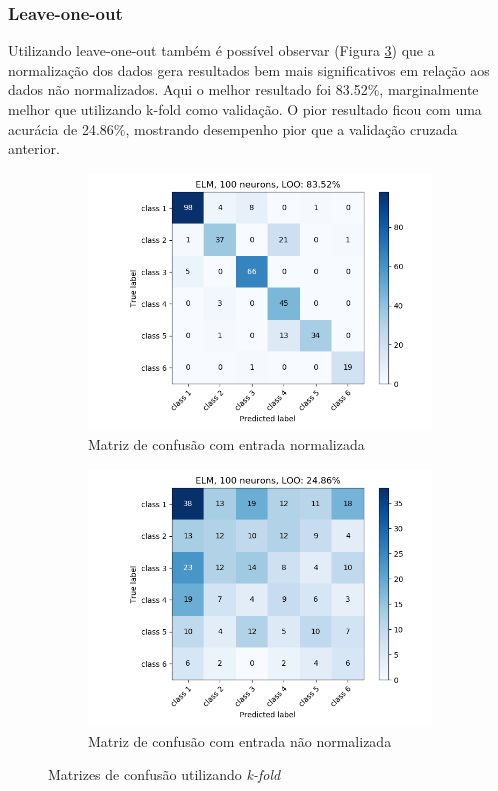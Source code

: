 \documentclass[paper=a4, fontsize=11pt]{scrartcl}
\numberwithin{equation}{section}		%
\numberwithin{figure}{section}			%
\numberwithin{table}{section}				%
\begin{document}
	\subsubsection{Leave-one-out}
	
	Utilizando leave-one-out também é possível observar (Figura \ref{fig:ELM_confusao_LOO}) que a normalização dos dados gera resultados bem mais significativos em relação aos dados não normalizados. Aqui o melhor resultado foi 83.52\%, marginalmente melhor que utilizando k-fold como validação. O pior resultado ficou com uma acurácia de 24.86\%, mostrando desempenho pior que a validação cruzada anterior.
	
	\begin{figure}[h!]
		\begin{subfigure}{.45\textwidth}
			\centering
			\includegraphics[width=\linewidth]{img/q3_elm_loo_norm.png}
			\caption{Matriz de confusão com entrada normalizada}
			\label{fig:q3mlpnorm}
		\end{subfigure}%
		\begin{subfigure}{.45\textwidth}
			\centering
			\includegraphics[width=\linewidth]{img/q3_elm_loo_notNorm.png}
			\caption{Matriz de confusão com entrada não normalizada}
			\label{fig:q3mlpnotnorm}
		\end{subfigure}
		\caption{Matrizes de confusão utilizando \textit{k-fold}}
		\label{fig:ELM_confusao_LOO}
	\end{figure}
	
\end{document}
